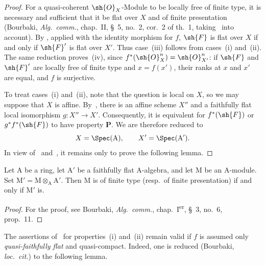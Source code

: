 
\begin{proof}
For a quasi-coherent $\sh{O}_X$-Module to be locally free of finite type,
it is necessary and sufficient that it be flat over $X$ and of finite
presentation (Bourbaki, \emph{Alg.\ comm.}, chap.~II, \S~5, no.~2,
cor.~2 of th.~1, taking~ into account). By
, applied with the identity morphism for $f$, $\sh{F}$ is
flat over $X$ if and only if $\sh{F}'$ is flat over $X'$. Thus case~(iii)
follows from cases~(i) and~(ii). The same reduction proves~(iv), since
$f^*(\sh{O}_X^n)=\sh{O}_{X'}^n$: if $\sh{F}$ and $\sh{F}'$ are locally
free of finite type and $x=f(x')$, their ranks at $x$ and $x'$ are equal,
and $f$ is surjective.


To treat cases~(i) and~(ii), note that the question is local on $X$, so we
may suppose that $X$ is affine. By~, there is an affine
scheme $X''$ and a faithfully flat local isomorphism $g:X''\to X'$.
Consequently, it is equivalent for $f^*(\sh{F})$ or
$g^*f^*(\sh{F})$ to have property $\mathbf{P}$. We are therefore reduced
to
\[
  X=\Spec(\mathrm{A}),\qquad X'=\Spec(\mathrm{A}').
\]
In view of~ and~, it remains only to
prove the following lemma.
\end{proof}

\begin{lemma}[2.5.3]
\label{IV.2.5.3}
Let $\mathrm{A}$ be a ring, let $\mathrm{A}'$ be a faithfully flat
$\mathrm{A}$-algebra, and let $\mathrm{M}$ be an $\mathrm{A}$-module.
Set $\mathrm{M}'=\mathrm{M}\otimes_{\mathrm{A}}\mathrm{A}'$. Then
$\mathrm{M}$ is of finite type \textnormal{(}resp.\ of finite
presentation\textnormal{)} if and only if $\mathrm{M}'$ is.
\end{lemma}

\begin{proof}
For the proof, see Bourbaki, \emph{Alg.\ comm.}, chap.~I\textsuperscript{er}, \S~3, no.~6, prop.~11.
\end{proof}

\begin{remark}[2.5.4]
\label{IV.2.5.4}
The assertions of~ for properties~(i) and~(ii) remain
valid if $f$ is assumed only \emph{quasi-faithfully flat}
 and quasi-compact. Indeed, one is reduced (Bourbaki,
\emph{loc.\ cit.}) to the following lemma.
\end{remark}

